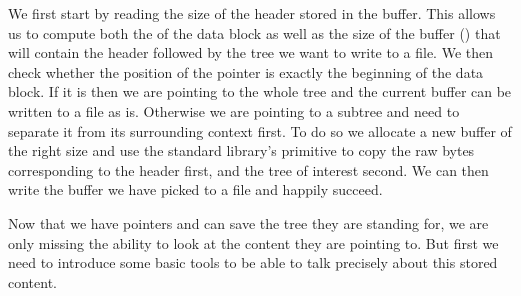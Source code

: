 We first start by reading the size of the header stored in the buffer.
%
This allows us to compute both the  of the data block
as well as the size of the buffer () that will
contain the header followed by the tree we want to write to a file.
%
We then check whether the position of the pointer is exactly the beginning
of the data block.
%
If it is then we are pointing to the whole tree and the current buffer can
be written to a file as is.
%
Otherwise we are pointing to a subtree and need to separate it from its
surrounding context first.
%
To do so we allocate a new buffer of the right size and use the
standard library's  primitive to copy the raw bytes
corresponding to the header first, and the tree of interest second.
%
We can then write the buffer we have picked to a file and happily succeed.



Now that we have pointers and can save the tree they are standing for,
we are only missing the ability to look at the content they are pointing to.
%
But first we need to introduce some basic tools
to be able to talk precisely about this stored content.
